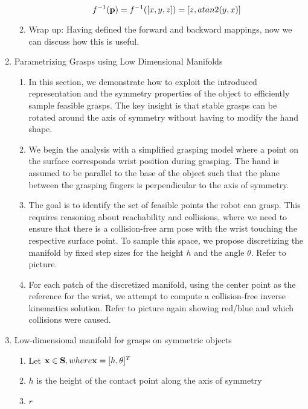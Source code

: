 \documentclass{aamas2015}
\begin{document}
\begin{enumerate}
\begin{enumerate}
		\begin{equation}
			f^{-1}(\textbf{p}) = f^{-1}([x,y,z]) = [z, atan2(y,x)]
		\end{equation}
		
		\item Wrap up: Having defined the forward and backward mappings, now we can discuss how this is useful.
	\end{enumerate}
	
	\item Parametrizing Grasps using Low Dimensional Manifolds
	\begin{enumerate}
		
		\item In this section, we demonstrate how to exploit the introduced representation and the symmetry properties of the object to efficiently sample feasible grasps. The key insight is that stable grasps can be rotated around the axis of symmetry without having to modify the hand shape. 
			
		\item We begin the analysis with a simplified grasping model where a point
		on the surface corresponds wrist position during grasping. The hand is assumed to be parallel to the base of the object such that the plane between the grasping fingers is perpendicular to the axis of symmetry. 

		\item The goal is to identify the set of feasible points the robot can grasp. This requires reasoning about reachability and collisions, where we need to ensure that there is a collision-free arm pose with the wrist touching the respective surface point. To sample this space, we propose discretizing the manifold by fixed step sizes for the height $h$ and the angle $\theta$. Refer to picture.
		
		\item For each patch of the discretized manifold, using the center point 
		as the reference for the wrist, we attempt to compute a collision-free 		inverse kinematics solution. Refer to picture again showing red/blue and which collisions were caused. 
		
		
	\end{enumerate}
	
	\item Low-dimensional manifold for grasps on symmetric objects	
	\begin{enumerate}
	\item Let $\textbf{x} \in \textbf{S}, where \textbf{x} = [h, \theta]^T$
	\item $h$ is the height of the contact point along the axis of symmetry
	\item $r$
	\end{enumerate}

\end{enumerate}
\end{document}

